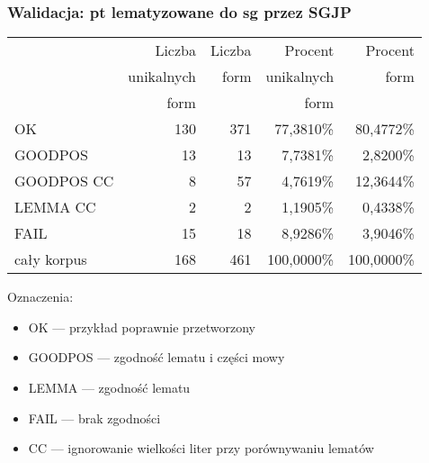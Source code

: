 \documentclass{beamer}
\begin{document}
\begin{frame}
\frametitle{Walidacja: pt lematyzowane do sg przez SGJP}
\begin{center}\begin{scriptsize}
\begin{tabular}{l|rrrr}
 & Liczba & Liczba & Procent & Procent\\
 & unikalnych & form & unikalnych & form\\
 & form & & form & \\
\hline
OK & 130 & 371 & 77,3810\% & 80,4772\% \\
GOODPOS & 13 & 13 & 7,7381\% & 2,8200\% \\
GOODPOS CC & 8 & 57 & 4,7619\% & 12,3644\% \\
LEMMA CC & 2 & 2 & 1,1905\% & 0,4338\% \\
FAIL & 15 & 18 & 8,9286\% & 3,9046\% \\
\hline
cały korpus & 168 & 461 & 100,0000\% & 100,0000\%\\
\end{tabular}
\end{scriptsize}\end{center}
Oznaczenia:
\begin{itemize}
\item OK --- przykład poprawnie przetworzony
\item GOODPOS --- zgodność lematu i części mowy
\item LEMMA --- zgodność lematu
\item FAIL --- brak zgodności
\item CC --- ignorowanie wielkości liter przy porównywaniu lematów
\end{itemize}


\end{frame}
\end{document}
